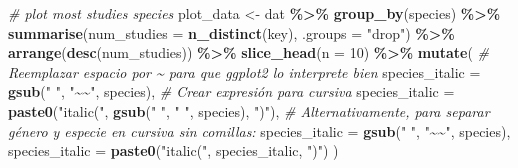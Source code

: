 \documentclass[
]{article}
\newenvironment{Shaded}{\begin{snugshade}}{\end{snugshade}}
\newcommand{\AttributeTok}[1]{\textcolor[rgb]{0.13,0.29,0.53}{#1}}
\newcommand{\CommentTok}[1]{\textcolor[rgb]{0.56,0.35,0.01}{\textit{#1}}}
\newcommand{\DecValTok}[1]{\textcolor[rgb]{0.00,0.00,0.81}{#1}}
\newcommand{\FunctionTok}[1]{\textcolor[rgb]{0.13,0.29,0.53}{\textbf{#1}}}
\newcommand{\NormalTok}[1]{#1}
\newcommand{\OtherTok}[1]{\textcolor[rgb]{0.56,0.35,0.01}{#1}}
\newcommand{\SpecialCharTok}[1]{\textcolor[rgb]{0.81,0.36,0.00}{\textbf{#1}}}
\newcommand{\StringTok}[1]{\textcolor[rgb]{0.31,0.60,0.02}{#1}}
\begin{document}
\begin{Shaded}
\begin{Highlighting}[]
\CommentTok{\# plot most studies species}
\NormalTok{plot\_data }\OtherTok{\textless{}{-}}\NormalTok{ dat }\SpecialCharTok{\%\textgreater{}\%}
  \FunctionTok{group\_by}\NormalTok{(species) }\SpecialCharTok{\%\textgreater{}\%}
  \FunctionTok{summarise}\NormalTok{(}\AttributeTok{num\_studies =} \FunctionTok{n\_distinct}\NormalTok{(key), }\AttributeTok{.groups =} \StringTok{"drop"}\NormalTok{) }\SpecialCharTok{\%\textgreater{}\%}
  \FunctionTok{arrange}\NormalTok{(}\FunctionTok{desc}\NormalTok{(num\_studies)) }\SpecialCharTok{\%\textgreater{}\%}
  \FunctionTok{slice\_head}\NormalTok{(}\AttributeTok{n =} \DecValTok{10}\NormalTok{) }\SpecialCharTok{\%\textgreater{}\%}
  \FunctionTok{mutate}\NormalTok{(}
    \CommentTok{\# Reemplazar espacio por \textasciitilde{} para que ggplot2 lo interprete bien}
    \AttributeTok{species\_italic =} \FunctionTok{gsub}\NormalTok{(}\StringTok{" "}\NormalTok{, }\StringTok{"\textasciitilde{}\textasciitilde{}"}\NormalTok{, species),}
    \CommentTok{\# Crear expresión para cursiva}
    \AttributeTok{species\_italic =} \FunctionTok{paste0}\NormalTok{(}\StringTok{"italic(\textquotesingle{}"}\NormalTok{, }\FunctionTok{gsub}\NormalTok{(}\StringTok{" "}\NormalTok{, }\StringTok{" "}\NormalTok{, species), }\StringTok{"\textquotesingle{})"}\NormalTok{),}
    \CommentTok{\# Alternativamente, para separar género y especie en cursiva sin comillas:}
    \AttributeTok{species\_italic =} \FunctionTok{gsub}\NormalTok{(}\StringTok{" "}\NormalTok{, }\StringTok{"\textasciitilde{}\textasciitilde{}"}\NormalTok{, species),}
    \AttributeTok{species\_italic =} \FunctionTok{paste0}\NormalTok{(}\StringTok{"italic("}\NormalTok{, species\_italic, }\StringTok{")"}\NormalTok{)}
\NormalTok{  )}


\end{Highlighting}
\end{Shaded}
\end{document}
